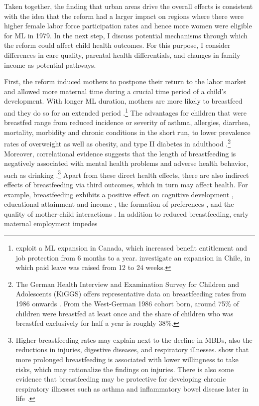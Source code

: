 Taken together, the finding that urban areas drive the overall effects is consistent with the idea that the reform had a larger impact on regions where there were higher female labor force participation rates and hence more women were eligible for ML in 1979. In the next step, I discuss potential mechanisms through which the reform could affect child health outcomes. For this purpose, I consider differences in care quality, parental health differentials, and changes in family income as potential pathways.



First, the reform induced mothers to postpone their return to the labor market and allowed more maternal time during a crucial time period of a child's development. With longer ML duration, mothers are more likely to breastfeed and they do so for an extended period \citep{baker2008maternal,albagli2018}.\footnote{\cite{baker2008maternal} exploit a ML expansion in Canada, which increased benefit entitlement and job protection from 6 months to a year. \cite{albagli2018} investigate an expansion in Chile, in which paid leave was raised from 12 to 24 weeks.} The advantages for children that were breastfed range from reduced incidence or severity of asthma, allergies, diarrhea, mortality, morbidity and chronic conditions in the short run, to lower prevalence rates of overweight as well as obesity, and type II diabetes in adulthood \citep{ruhm2000parental, victora2016breastfeeding}.\footnote{The German Health Interview and Examination Survey for Children and Adolescents (KiGGS) offers representative data on breastfeeding rates from 1986 onwards \citep{lange2007breastfeeding}. From the West-German 1986 cohort born, around 75\% of children were breastfed at least once and the share of children who was breastfed exclusively for half a year is roughly 38\%.} Moreover, correlational evidence suggests that the length of breastfeeding is negatively associated with mental health problems and adverse health behavior, such as drinking \citep{oddy2010longterm,falk2016early}.\footnote{Higher breastfeeding rates may explain next to the decline in MBDs, also the reductions in injuries, digestive diseases, and respiratory illnesses. \cite{falk2016early} show that more prolonged breastfeeding is associated with lower willingness to take risks, which may rationalize the findings on injuries. There is also some evidence that breastfeeding may be protective for developing chronic respiratory illnesses such as asthma \citep{lodge2015breastfeeding,friedmann2005breastfeeding} and inflammatory bowel disease later in life \citep{le2010breast}.} Apart from these direct health effects, there are also indirect effects of breastfeeding via third outcomes, which in turn may affect health. For example, breastfeeding exhibits a positive effect on cognitive development \citep{albagli2018}, educational attainment and income \citep{victoria2015association}, the formation of preferences \citep{falk2016early}, and the quality of mother-child interactions \citep{papp2014longitudinal}. In addition to reduced breastfeeding, early maternal employment impedes 